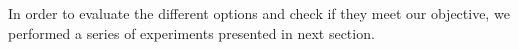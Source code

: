 \documentclass[sigconf]{acmart}
\begin{document}






In order to evaluate the different options and check if they meet our
objective, we performed a series of experiments presented in next
section. 
\end{document}
